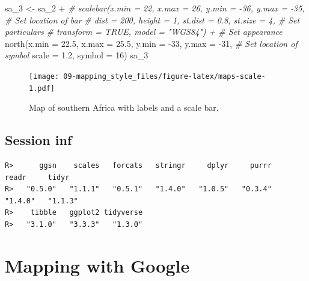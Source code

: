 \documentclass[
]{book}
\newenvironment{Shaded}{\begin{snugshade}}{\end{snugshade}}
\newcommand{\AttributeTok}[1]{\textcolor[rgb]{0.77,0.63,0.00}{#1}}
\newcommand{\CommentTok}[1]{\textcolor[rgb]{0.56,0.35,0.01}{\textit{#1}}}
\newcommand{\DecValTok}[1]{\textcolor[rgb]{0.00,0.00,0.81}{#1}}
\newcommand{\FloatTok}[1]{\textcolor[rgb]{0.00,0.00,0.81}{#1}}
\newcommand{\FunctionTok}[1]{\textcolor[rgb]{0.00,0.00,0.00}{#1}}
\newcommand{\NormalTok}[1]{#1}
\newcommand{\OtherTok}[1]{\textcolor[rgb]{0.56,0.35,0.01}{#1}}
\newcommand{\SpecialCharTok}[1]{\textcolor[rgb]{0.00,0.00,0.00}{#1}}
\newcommand{\StringTok}[1]{\textcolor[rgb]{0.31,0.60,0.02}{#1}}
\begin{document}
\begin{Shaded}
\begin{Highlighting}[]
\NormalTok{sa\_3 }\OtherTok{\textless{}{-}}\NormalTok{ sa\_2 }\SpecialCharTok{+}
  \CommentTok{\# scalebar(x.min = 22, x.max = 26, y.min = {-}36, y.max = {-}35, \# Set location of bar}
  \CommentTok{\#          dist = 200, height = 1, st.dist = 0.8, st.size = 4, \# Set particulars}
  \CommentTok{\#          transform = TRUE, model = "WGS84") + \# Set appearance}
  \FunctionTok{north}\NormalTok{(}\AttributeTok{x.min =} \FloatTok{22.5}\NormalTok{, }\AttributeTok{x.max =} \FloatTok{25.5}\NormalTok{, }\AttributeTok{y.min =} \SpecialCharTok{{-}}\DecValTok{33}\NormalTok{, }\AttributeTok{y.max =} \SpecialCharTok{{-}}\DecValTok{31}\NormalTok{, }\CommentTok{\# Set location of symbol}
        \AttributeTok{scale =} \FloatTok{1.2}\NormalTok{, }\AttributeTok{symbol =} \DecValTok{16}\NormalTok{)}
\NormalTok{sa\_3}
\end{Highlighting}
\end{Shaded}

\begin{figure}
\centering
\texttt{[image: 09-mapping\_style\_files/figure-latex/maps-scale-1.pdf]}
\caption{\label{fig:maps-scale}Map of southern Africa with labels and a scale bar.}
\end{figure}

\hypertarget{session-inf}{%
\section{Session inf}\label{session-inf}}

\begin{Shaded}
\end{Shaded}

\begin{verbatim}
R>      ggsn    scales   forcats   stringr     dplyr     purrr     readr     tidyr 
R>   "0.5.0"   "1.1.1"   "0.5.1"   "1.4.0"   "1.0.5"   "0.3.4"   "1.4.0"   "1.1.3" 
R>    tibble   ggplot2 tidyverse 
R>   "3.1.0"   "3.3.3"   "1.3.0"
\end{verbatim}

\hypertarget{mapping_google}{%
\chapter{Mapping with Google}\label{mapping_google}}
\end{document}
